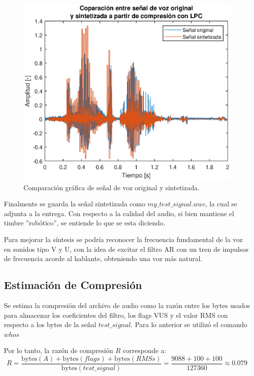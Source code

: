 \begin{figure}[H]
    \centering
    \includegraphics[width = .9\linewidth]{figures/p3_1.eps}
    \caption{Comparación gráfica de señal de voz original y sintetizada.}
    \label{fig:p3_1}
\end{figure}

Finalmente se guarda la señal sintetizada como $my\_test\_signal.wav$, la cual se adjunta a la entrega. Con respecto a la calidad del audio, si bien mantiene el timbre ''robótico'', se entiende lo que se esta diciendo. 

Para mejorar la síntesis se podría reconocer la frecuencia fundamental de la voz en sonidos tipo V y U, con la idea de excitar el filtro AR con un tren de impulsos de frecuencia acorde al hablante, obteniendo una voz más natural.

\subsection{Estimación de Compresión}

Se estima la compresión del archivo de audio como la razón entre los bytes usados para almacenar los coeficientes del filtro, los flags VUS y el valor RMS con respecto a los bytes de la señal $test\_signal$. Para lo anterior se utilizó el comando $whos$

Por lo tanto, la razón de compresión $R$ corresponde a:
$$ R = \dfrac{\text{bytes}(A) + \text{bytes}(flags) + \text{bytes}(RMSs)} {\text{bytes}(test\_signal)} = \dfrac{9088 + 100 + 100}{127360} \approx  0.079$$